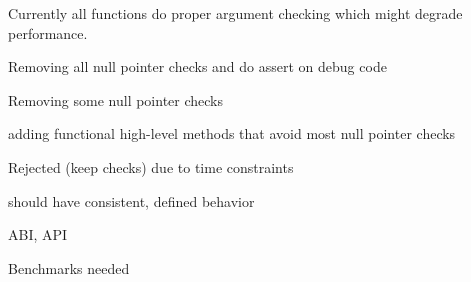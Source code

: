 Currently all functions do proper argument checking which might degrade performance.


\begin{DoxyItemize}
\item Removing all null pointer checks and do assert on debug code
\item Removing some null pointer checks
\item adding functional high-\/level methods that avoid most null pointer checks
\end{DoxyItemize}

Rejected (keep checks) due to time constraints


\begin{DoxyItemize}
\item should have consistent, defined behavior
\end{DoxyItemize}


\begin{DoxyItemize}
\item A\+BI, A\+PI
\end{DoxyItemize}


\begin{DoxyItemize}
\item Benchmarks needed 
\end{DoxyItemize}